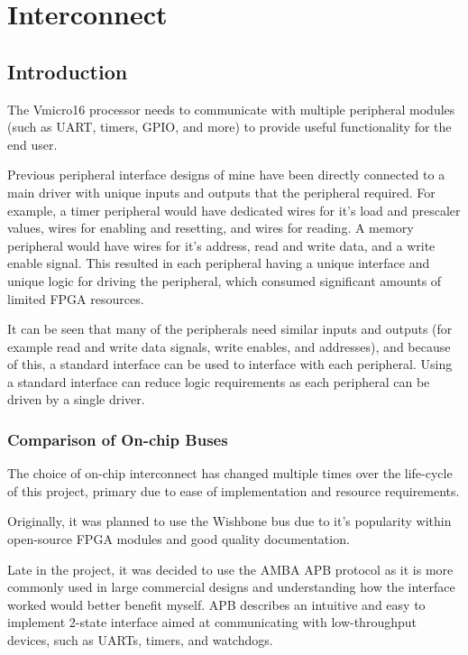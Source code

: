 
\chapter{Interconnect}
\startcontents[chapters]


\section{Introduction}
The Vmicro16 processor needs to communicate with multiple peripheral modules (such as UART, timers, GPIO, and more) to provide useful functionality for the end user.

Previous peripheral interface designs of mine have been directly connected to a main driver with unique inputs and outputs that the peripheral required. For example, a timer peripheral would have dedicated wires for it's load and prescaler values, wires for enabling and resetting, and wires for reading. A memory peripheral would have wires for it's address, read and write data, and a write enable signal. This resulted in each peripheral having a unique interface and unique logic for driving the peripheral, which consumed significant amounts of limited FPGA resources.

It can be seen that many of the peripherals need similar inputs and outputs (for example read and write data signals, write enables, and addresses), and because of this, a standard interface can be used to interface with each peripheral. Using a standard interface can reduce logic requirements as each peripheral can be driven by a single driver.

\subsection{Comparison of On-chip Buses}
The choice of on-chip interconnect has changed multiple times over the life-cycle of this project, primary due to ease of implementation and resource requirements. 

Originally, it was planned to use the Wishbone bus \cite{wishbone} due to it's popularity within open-source FPGA modules and good quality documentation.

Late in the project, it was decided to use the AMBA APB protocol \cite {ambaapb} as it is more commonly used in large commercial designs and understanding how the interface worked would better benefit myself. APB describes an intuitive and easy to implement 2-state interface aimed at communicating with low-throughput devices, such as UARTs, timers, and watchdogs.

